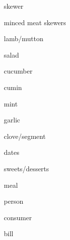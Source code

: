 \documentclass[avery5371,grid,frame]{flashcards}
\begin{document}
\begin{flashcard}{\LARGE skewer}
\LARGE {}
\end{flashcard}
\begin{flashcard}{\LARGE minced meat skewers}
\LARGE {}
\end{flashcard}
\begin{flashcard}{\LARGE lamb/mutton}
\LARGE {}
\end{flashcard}
\begin{flashcard}{\LARGE salad}
\LARGE {}
\end{flashcard}
\begin{flashcard}{\LARGE cucumber}
\LARGE {}
\end{flashcard}
\begin{flashcard}{\LARGE cumin}
\LARGE {}
\end{flashcard}
\begin{flashcard}{\LARGE mint}
\LARGE {}
\end{flashcard}
\begin{flashcard}{\LARGE garlic}
\LARGE {}
\end{flashcard}
\begin{flashcard}{\LARGE clove/segment}
\LARGE {}
\end{flashcard}
\begin{flashcard}{\LARGE dates}
\LARGE {}
\end{flashcard}
\begin{flashcard}{\LARGE sweets/desserts}
\LARGE {}
\end{flashcard}
\begin{flashcard}{\LARGE meal}
\LARGE {}
\end{flashcard}
\begin{flashcard}{\LARGE person}
\LARGE {}
\end{flashcard}
\begin{flashcard}{\LARGE consumer}
\LARGE {}
\end{flashcard}
\begin{flashcard}{\LARGE bill}
\LARGE {}
\end{flashcard}
\end{document}
